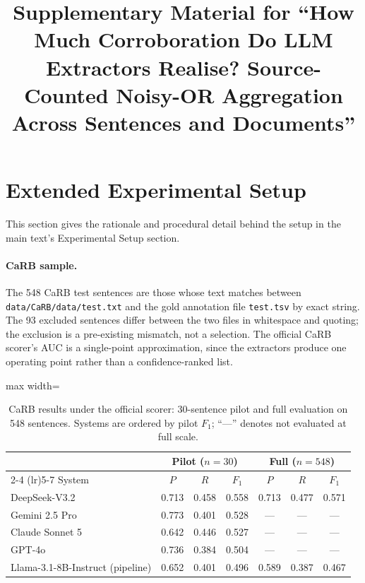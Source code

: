 \documentclass[11pt]{article}
\title{Supplementary Material for ``How Much Corroboration Do LLM
Extractors Realise? Source-Counted Noisy-OR Aggregation Across Sentences
and Documents''}
\date{}
\begin{document}
\maketitle

\section{Extended Experimental Setup}
\label{sec:s1}

This section gives the rationale and procedural detail behind the setup
in the main text's Experimental Setup section.

\paragraph{CaRB sample.} The 548 CaRB test sentences are those whose text
matches between \texttt{data/CaRB/data/test.txt} and the gold annotation
file \texttt{test.tsv} by exact string. The 93 excluded sentences differ
between the two files in whitespace and quoting; the exclusion is a
pre-existing mismatch, not a selection. The official CaRB scorer's AUC is
a single-point approximation, since the extractors produce one operating
point rather than a confidence-ranked list.

\begin{table}[htbp]
\centering
\caption{CaRB results under the official scorer: 30-sentence pilot and
full evaluation on 548 sentences. Systems are ordered by pilot $F_1$;
``---'' denotes not evaluated at full scale.}
\label{tab:s1-carb}
\begin{adjustbox}{max width=\textwidth}
\begin{tabular}{@{}l ccc ccc@{}}
\toprule
& \multicolumn{3}{c}{Pilot ($n=30$)} & \multicolumn{3}{c}{Full ($n=548$)} \\
\cmidrule(lr){2-4} \cmidrule(lr){5-7}
System & $P$ & $R$ & $F_1$ & $P$ & $R$ & $F_1$ \\
\midrule
DeepSeek-V3.2 & 0.713 & 0.458 & 0.558 & 0.713 & 0.477 & 0.571 \\
Gemini 2.5 Pro & 0.773 & 0.401 & 0.528 & --- & --- & --- \\
Claude Sonnet 5 & 0.642 & 0.446 & 0.527 & --- & --- & --- \\
GPT-4o & 0.736 & 0.384 & 0.504 & --- & --- & --- \\
Llama-3.1-8B-Instruct (pipeline) & 0.652 & 0.401 & 0.496 & 0.589 & 0.387 & 0.467 \\
\bottomrule
\end{tabular}
\end{adjustbox}
\end{table}
\end{document}
